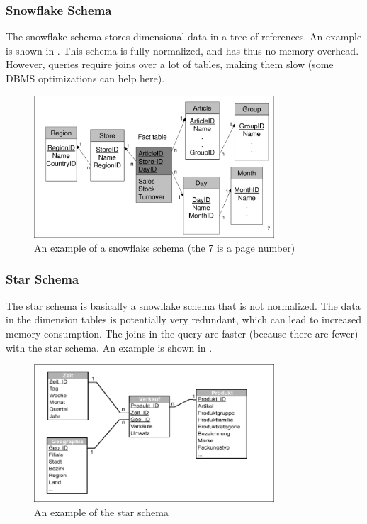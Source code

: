 \documentclass{article}
\begin{document}
\subsubsection{Snowflake Schema}
The snowflake schema stores dimensional data in a tree of references.
An example is shown in .
This schema is fully normalized, and has thus no memory overhead.
However, queries require joins over a lot of tables, making them slow (some DBMS optimizations can help here).

\begin{figure}[h]
    \centering
    \includegraphics[width=0.8\textwidth]{snowflake.png}
    \caption{An example of a snowflake schema (the 7 is a page number)}
    \label{fig:snowflake}
\end{figure}

\subsubsection{Star Schema}
The star schema is basically a snowflake schema that is not normalized.
The data in the dimension tables is potentially very redundant, which can lead to increased memory consumption.
The joins in the query are faster (because there are fewer) with the star schema.
An example is shown in .

\begin{figure}[h]
    \centering
    \includegraphics[width=0.8\textwidth]{star.png}
    \caption{An example of the star schema}
    \label{fig:star}
\end{figure}
\end{document}
